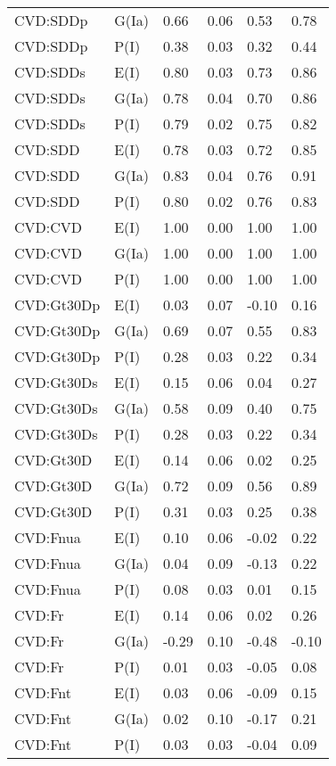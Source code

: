 \begin{center}
\begin{longtable}{|p{1.1in}|p{0.7in}|p{0.7in}|p{0.6in}|p{0.6in}|p{0.6in}|}
  CVD:SDDp & G(Ia) & 0.66 & 0.06 & 0.53 & 0.78 \\ 
  CVD:SDDp & P(I) & 0.38 & 0.03 & 0.32 & 0.44 \\ 
  CVD:SDDs & E(I) & 0.80 & 0.03 & 0.73 & 0.86 \\ 
  CVD:SDDs & G(Ia) & 0.78 & 0.04 & 0.70 & 0.86 \\ 
  CVD:SDDs & P(I) & 0.79 & 0.02 & 0.75 & 0.82 \\ 
  CVD:SDD & E(I) & 0.78 & 0.03 & 0.72 & 0.85 \\ 
  CVD:SDD & G(Ia) & 0.83 & 0.04 & 0.76 & 0.91 \\ 
  CVD:SDD & P(I) & 0.80 & 0.02 & 0.76 & 0.83 \\ 
  CVD:CVD & E(I) & 1.00 & 0.00 & 1.00 & 1.00 \\ 
  CVD:CVD & G(Ia) & 1.00 & 0.00 & 1.00 & 1.00 \\ 
  CVD:CVD & P(I) & 1.00 & 0.00 & 1.00 & 1.00 \\ 
  CVD:Gt30Dp & E(I) & 0.03 & 0.07 & -0.10 & 0.16 \\ 
  CVD:Gt30Dp & G(Ia) & 0.69 & 0.07 & 0.55 & 0.83 \\ 
  CVD:Gt30Dp & P(I) & 0.28 & 0.03 & 0.22 & 0.34 \\ 
  CVD:Gt30Ds & E(I) & 0.15 & 0.06 & 0.04 & 0.27 \\ 
  CVD:Gt30Ds & G(Ia) & 0.58 & 0.09 & 0.40 & 0.75 \\ 
  CVD:Gt30Ds & P(I) & 0.28 & 0.03 & 0.22 & 0.34 \\ 
  CVD:Gt30D & E(I) & 0.14 & 0.06 & 0.02 & 0.25 \\ 
  CVD:Gt30D & G(Ia) & 0.72 & 0.09 & 0.56 & 0.89 \\ 
  CVD:Gt30D & P(I) & 0.31 & 0.03 & 0.25 & 0.38 \\ 
  CVD:Fnua & E(I) & 0.10 & 0.06 & -0.02 & 0.22 \\ 
  CVD:Fnua & G(Ia) & 0.04 & 0.09 & -0.13 & 0.22 \\ 
  CVD:Fnua & P(I) & 0.08 & 0.03 & 0.01 & 0.15 \\ 
  CVD:Fr & E(I) & 0.14 & 0.06 & 0.02 & 0.26 \\ 
  CVD:Fr & G(Ia) & -0.29 & 0.10 & -0.48 & -0.10 \\ 
  CVD:Fr & P(I) & 0.01 & 0.03 & -0.05 & 0.08 \\ 
  CVD:Fnt & E(I) & 0.03 & 0.06 & -0.09 & 0.15 \\ 
  CVD:Fnt & G(Ia) & 0.02 & 0.10 & -0.17 & 0.21 \\ 
  CVD:Fnt & P(I) & 0.03 & 0.03 & -0.04 & 0.09 \\ 

\end{longtable}
\end{center}
